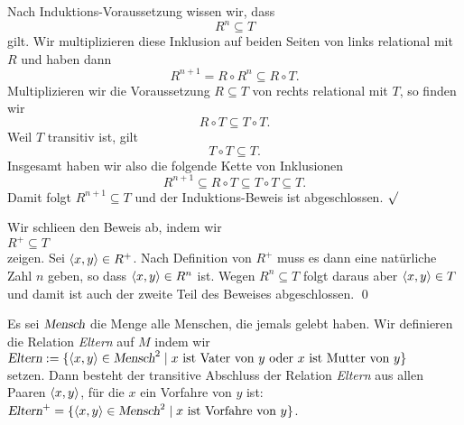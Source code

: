 \begin{enumerate}
\begin{enumerate}
             Nach Induktions-Voraussetzung wissen wir, dass
              \[ R^n \subseteq T \]
             gilt.
             Wir multiplizieren diese Inklusion auf beiden Seiten von links relational mit $R$
             und haben dann
             \[ R^{n+1} = R \circ R^n \subseteq R \circ T. \]
             Multiplizieren wir die Voraussetzung $R \subseteq T$ von rechts relational mit
             $T$, so finden wir
             \[ R \circ T \subseteq T \circ T. \]
             Weil $T$ transitiv ist, gilt 
             \[ T \circ T \subseteq T. \]
             Insgesamt haben wir also die folgende Kette von Inklusionen
             \[ R^{n+1} \subseteq R \circ T \subseteq T \circ T \subseteq T. \]
             Damit folgt $R^{n+1} \subseteq T$ und der Induktions-Beweis ist
             abgeschlossen. $\surd$
\end{enumerate}
Wir schlie\3en den Beweis ab, indem wir
\\[0.2cm]
\hspace*{1.3cm}
 $R^+ \subseteq T$ 
\\[0.2cm]
zeigen.  Sei $\pair(x,y) \in R^+$.
Nach Definition von $R^+$ muss es dann eine  nat\"{u}rliche Zahl $n$ geben, so
dass $\pair(x,y) \in R^n$ ist.  Wegen $R^n \subseteq T$ folgt daraus aber
$\pair(x,y) \in T$ und damit ist auch der zweite Teil des Beweises abgeschlossen. \qed
\end{enumerate}

\example
Es sei $\textsl{Mensch}$ die Menge alle Menschen, die jemals gelebt haben.  Wir definieren
die Relation \textsl{Eltern} auf $M$ indem wir 
\\[0.2cm]
\hspace*{1.3cm}
$\textsl{Eltern} := \{ \pair(x,y) \in \textsl{Mensch}^2 \mid \mbox{$x$ ist Vater von $y$ oder 
                                                                   $x$ ist Mutter von $y$} \}$
\\[0.2cm]
setzen.  Dann besteht der transitive Abschluss der Relation \textsl{Eltern} aus allen Paaren 
$\pair(x,y)$, f\"{u}r die $x$ ein Vorfahre von $y$ ist:
\\[0.2cm]
\hspace*{1.3cm}
$\textsl{Eltern}^+ = \{ \pair(x,y) \in \textsl{Mensch}^2 \mid \mbox{$x$ ist Vorfahre von $y$} \}$.
\eox



